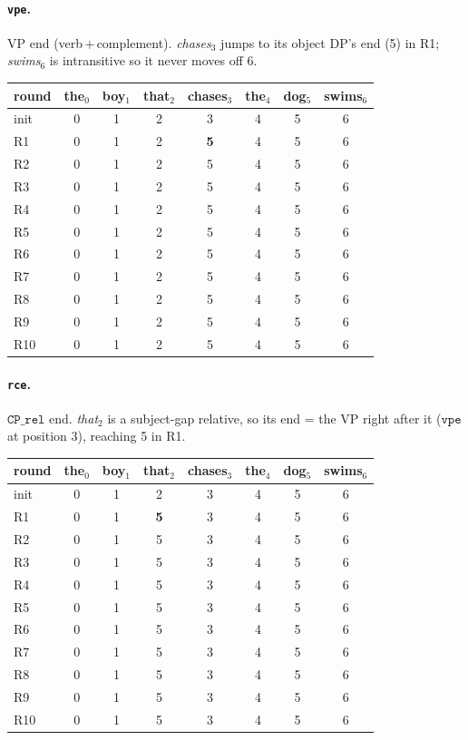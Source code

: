 \documentclass[10pt]{article}
\begin{document}
\paragraph{\texttt{vpe}.} VP end (verb\,+\,complement). \emph{chases}$_3$ jumps to its object DP's end (5) in R1; \emph{swims}$_6$ is intransitive so it never moves off 6.
\begin{center}\footnotesize\setlength{\tabcolsep}{4pt}\renewcommand{\arraystretch}{1.1}
\begin{tabular}{@{}l|ccccccc@{}}
\toprule \textbf{round} & the$_{0}$ & boy$_{1}$ & that$_{2}$ & chases$_{3}$ & the$_{4}$ & dog$_{5}$ & swims$_{6}$ \\ \midrule
init & 0 & 1 & 2 & 3 & 4 & 5 & 6 \\
R1 & 0 & 1 & 2 & \textcolor{chg}{\textbf{5}} & 4 & 5 & 6 \\
R2 & 0 & 1 & 2 & 5 & 4 & 5 & 6 \\
R3 & 0 & 1 & 2 & 5 & 4 & 5 & 6 \\
R4 & 0 & 1 & 2 & 5 & 4 & 5 & 6 \\
R5 & 0 & 1 & 2 & 5 & 4 & 5 & 6 \\
R6 & 0 & 1 & 2 & 5 & 4 & 5 & 6 \\
R7 & 0 & 1 & 2 & 5 & 4 & 5 & 6 \\
R8 & 0 & 1 & 2 & 5 & 4 & 5 & 6 \\
R9 & 0 & 1 & 2 & 5 & 4 & 5 & 6 \\
R10 & 0 & 1 & 2 & 5 & 4 & 5 & 6 \\
\bottomrule\end{tabular}\end{center}
\paragraph{\texttt{rce}.} $\texttt{CP\_rel}$ end. \emph{that}$_2$ is a subject-gap relative, so its end = the VP right after it ($\texttt{vpe}$ at position 3), reaching 5 in R1.
\begin{center}\footnotesize\setlength{\tabcolsep}{4pt}\renewcommand{\arraystretch}{1.1}
\begin{tabular}{@{}l|ccccccc@{}}
\toprule \textbf{round} & the$_{0}$ & boy$_{1}$ & that$_{2}$ & chases$_{3}$ & the$_{4}$ & dog$_{5}$ & swims$_{6}$ \\ \midrule
init & 0 & 1 & 2 & 3 & 4 & 5 & 6 \\
R1 & 0 & 1 & \textcolor{chg}{\textbf{5}} & 3 & 4 & 5 & 6 \\
R2 & 0 & 1 & 5 & 3 & 4 & 5 & 6 \\
R3 & 0 & 1 & 5 & 3 & 4 & 5 & 6 \\
R4 & 0 & 1 & 5 & 3 & 4 & 5 & 6 \\
R5 & 0 & 1 & 5 & 3 & 4 & 5 & 6 \\
R6 & 0 & 1 & 5 & 3 & 4 & 5 & 6 \\
R7 & 0 & 1 & 5 & 3 & 4 & 5 & 6 \\
R8 & 0 & 1 & 5 & 3 & 4 & 5 & 6 \\
R9 & 0 & 1 & 5 & 3 & 4 & 5 & 6 \\
R10 & 0 & 1 & 5 & 3 & 4 & 5 & 6 \\
\bottomrule\end{tabular}\end{center}
\end{document}
